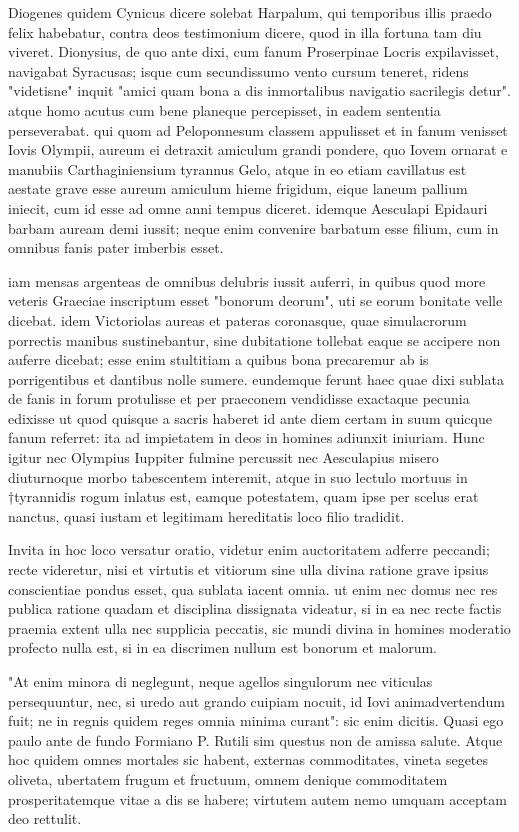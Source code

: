  Diogenes quidem Cynicus dicere solebat Harpalum, qui temporibus illis praedo felix habebatur, contra deos testimonium dicere, quod in illa fortuna tam diu viveret. Dionysius, de quo ante dixi, cum fanum Proserpinae Locris expilavisset, navigabat Syracusas; isque cum secundissumo vento cursum teneret, ridens "videtisne" inquit "amici quam bona a dis inmortalibus navigatio sacrilegis detur". atque homo acutus cum bene planeque percepisset, in eadem sententia perseverabat. qui quom ad Peloponnesum classem appulisset et in fanum venisset Iovis Olympii, aureum ei detraxit amiculum grandi pondere, quo Iovem ornarat e manubiis Carthaginiensium tyrannus Gelo, atque in eo etiam cavillatus est aestate grave esse aureum amiculum hieme frigidum, eique laneum pallium iniecit, cum id esse ad omne anni tempus diceret. idemque Aesculapi Epidauri barbam auream demi iussit; neque enim convenire barbatum esse filium, cum in omnibus fanis pater imberbis esset.

 iam mensas argenteas de omnibus delubris iussit auferri, in quibus quod more veteris Graeciae inscriptum esset "bonorum deorum", uti se eorum bonitate velle dicebat. idem Victoriolas aureas et pateras coronasque, quae simulacrorum porrectis manibus sustinebantur, sine dubitatione tollebat eaque se accipere non auferre dicebat; esse enim stultitiam a quibus bona precaremur ab is porrigentibus et dantibus nolle sumere. eundemque ferunt haec quae dixi sublata de fanis in forum protulisse et per praeconem vendidisse exactaque pecunia edixisse ut quod quisque a sacris haberet id ante diem certam in suum quicque fanum referret: ita ad impietatem in deos in homines adiunxit iniuriam. Hunc igitur nec Olympius Iuppiter fulmine percussit nec Aesculapius misero diuturnoque morbo tabescentem interemit, atque in suo lectulo mortuus in †tyrannidis rogum inlatus est, eamque potestatem, quam ipse per scelus erat nanctus, quasi iustam et legitimam hereditatis loco filio tradidit.

 Invita in hoc loco versatur oratio, videtur enim auctoritatem adferre peccandi; recte videretur, nisi et virtutis et vitiorum sine ulla divina ratione grave ipsius conscientiae pondus esset, qua sublata iacent omnia. ut enim nec domus nec res publica ratione quadam et disciplina dissignata videatur, si in ea nec recte factis praemia extent ulla nec supplicia peccatis, sic mundi divina in homines moderatio profecto nulla est, si in ea discrimen nullum est bonorum et malorum.

 "At enim minora di neglegunt, neque agellos singulorum nec viticulas persequuntur, nec, si uredo aut grando cuipiam nocuit, id Iovi animadvertendum fuit; ne in regnis quidem reges omnia minima curant": sic enim dicitis. Quasi ego paulo ante de fundo Formiano P. Rutili sim questus non de amissa salute. Atque hoc quidem omnes mortales sic habent, externas commoditates, vineta segetes oliveta, ubertatem frugum et fructuum, omnem denique commoditatem prosperitatemque vitae a dis se habere; virtutem autem nemo umquam acceptam deo rettulit.

